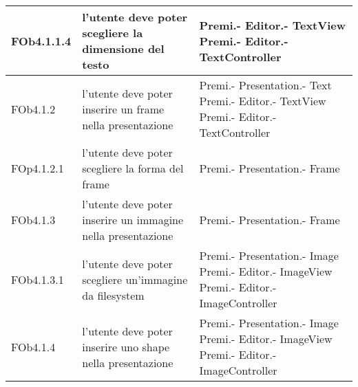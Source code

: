 \begin{longtable}{|l|p{5cm}|p{7cm}|}
\hline
FOb4.1.1.4 & l'utente deve poter scegliere la dimensione del testo & Premi.- \linebreak Editor.- \linebreak TextView \linebreak Premi.- \linebreak Editor.- \linebreak TextController \linebreak \\
\hline
FOb4.1.2 & l'utente deve poter inserire un frame nella presentazione & Premi.- \linebreak Presentation.- \linebreak Text \linebreak Premi.- \linebreak Editor.- \linebreak TextView \linebreak Premi.- \linebreak Editor.- \linebreak TextController \linebreak \\
\hline
FOp4.1.2.1 & l'utente deve poter scegliere la forma del frame & Premi.- \linebreak Presentation.- \linebreak Frame \linebreak \\
\hline
FOb4.1.3 & l'utente deve poter inserire un immagine nella presentazione & Premi.- \linebreak Presentation.- \linebreak Frame \linebreak \\
\hline
FOb4.1.3.1 & l'utente deve poter scegliere un'immagine da filesystem & Premi.- \linebreak Presentation.- \linebreak Image \linebreak Premi.- \linebreak Editor.- \linebreak ImageView \linebreak Premi.- \linebreak Editor.- \linebreak ImageController \linebreak \\
\hline
FOb4.1.4 & l'utente deve poter inserire uno shape nella presentazione & Premi.- \linebreak Presentation.- \linebreak Image \linebreak Premi.- \linebreak Editor.- \linebreak ImageView \linebreak Premi.- \linebreak Editor.- \linebreak ImageController \linebreak \\

\end{longtable}
